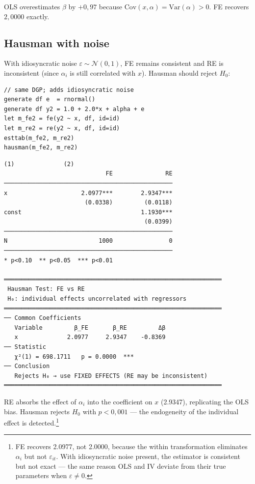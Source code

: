OLS overestimates $\beta$ by $+0{,}97$ because $\mathrm{Cov}(x,\alpha) =
\mathrm{Var}(\alpha) > 0$. FE recovers $2{,}0000$ exactly.

\subsection*{Hausman with noise}

With idiosyncratic noise $\varepsilon \sim \mathcal{N}(0,1)$, FE remains
consistent and RE is inconsistent (since $\alpha_i$ is still correlated
with $x$). Hausman should reject $H_0$:

\begin{lstlisting}[caption={Hausman --- FE vs RE with correlated effect}]
// same DGP; adds idiosyncratic noise
generate df e  = rnormal()
generate df y2 = 1.0 + 2.0*x + alpha + e
let m_fe2 = fe(y2 ~ x, df, id=id)
let m_re2 = re(y2 ~ x, df, id=id)
esttab(m_fe2, m_re2)
hausman(m_fe2, m_re2)
\end{lstlisting}

\begin{lstlisting}[language={}, basicstyle=\ttfamily\small,
  frame=none, numbers=none, backgroundcolor=\color{codbg},
  xleftmargin=0pt, xrightmargin=0pt, breaklines=false]
                            (1)              (2)
                             FE               RE
────────────────────────────────────────────────
x                     2.0977***        2.9347***
                       (0.0338)         (0.0118)
const                                  1.1930***
                                        (0.0399)
────────────────────────────────────────────────
N                          1000                0
────────────────────────────────────────────────
* p<0.10  ** p<0.05  *** p<0.01

══════════════════════════════════════════════════════════════
 Hausman Test: FE vs RE
 H₀: individual effects uncorrelated with regressors
══════════════════════════════════════════════════════════════
── Common Coefficients
   Variable         β_FE       β_RE         Δβ
   x              2.0977     2.9347    -0.8369
── Statistic
   χ²(1) = 698.1711   p = 0.0000  ***
── Conclusion
   Rejects H₀ → use FIXED EFFECTS (RE may be inconsistent)
══════════════════════════════════════════════════════════════
\end{lstlisting}

RE absorbs the effect of $\alpha_i$ into the coefficient on $x$ (2.9347), replicating
the OLS bias. Hausman rejects $H_0$ with $p < 0{,}001$ --- the endogeneity
of the individual effect is detected.\footnote{%
  FE recovers 2.0977, not 2.0000, because the within transformation eliminates
  $\alpha_i$ but not $\varepsilon_{it}$. With idiosyncratic noise present,
  the estimator is consistent but not exact --- the same reason OLS
  and IV deviate from their true parameters when $\varepsilon \neq 0$.}

